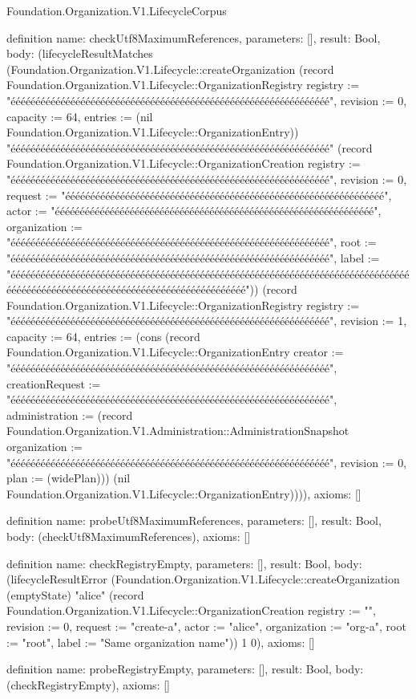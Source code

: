 \begin{lexlean}{Foundation.Organization.V1.LifecycleCorpus}
\begin{semanticmodule}
definition{
  name: checkUtf8MaximumReferences,
  parameters: [],
  result: Bool,
  body: (lifecycleResultMatches (Foundation.Organization.V1.Lifecycle::createOrganization (record Foundation.Organization.V1.Lifecycle::OrganizationRegistry {registry := "éééééééééééééééééééééééééééééééééééééééééééééééééééééééééééééééé", revision := 0, capacity := 64, entries := (nil Foundation.Organization.V1.Lifecycle::OrganizationEntry)}) "éééééééééééééééééééééééééééééééééééééééééééééééééééééééééééééééé" (record Foundation.Organization.V1.Lifecycle::OrganizationCreation {registry := "éééééééééééééééééééééééééééééééééééééééééééééééééééééééééééééééé", revision := 0, request := "éééééééééééééééééééééééééééééééééééééééééééééééééééééééééééééééé", actor := "éééééééééééééééééééééééééééééééééééééééééééééééééééééééééééééééé", organization := "éééééééééééééééééééééééééééééééééééééééééééééééééééééééééééééééé", root := "éééééééééééééééééééééééééééééééééééééééééééééééééééééééééééééééé", label := "éééééééééééééééééééééééééééééééééééééééééééééééééééééééééééééééééééééééééééééééééééééééééééééééééééééééééééééééééééééééééééééééé"})) (record Foundation.Organization.V1.Lifecycle::OrganizationRegistry {registry := "éééééééééééééééééééééééééééééééééééééééééééééééééééééééééééééééé", revision := 1, capacity := 64, entries := (cons (record Foundation.Organization.V1.Lifecycle::OrganizationEntry {creator := "éééééééééééééééééééééééééééééééééééééééééééééééééééééééééééééééé", creationRequest := "éééééééééééééééééééééééééééééééééééééééééééééééééééééééééééééééé", administration := (record Foundation.Organization.V1.Administration::AdministrationSnapshot {organization := "éééééééééééééééééééééééééééééééééééééééééééééééééééééééééééééééé", revision := 0, plan := (widePlan)})}) (nil Foundation.Organization.V1.Lifecycle::OrganizationEntry))})),
  axioms: []
}

definition{
  name: probeUtf8MaximumReferences,
  parameters: [],
  result: Bool,
  body: (checkUtf8MaximumReferences),
  axioms: []
}

definition{
  name: checkRegistryEmpty,
  parameters: [],
  result: Bool,
  body: (lifecycleResultError (Foundation.Organization.V1.Lifecycle::createOrganization (emptyState) "alice" (record Foundation.Organization.V1.Lifecycle::OrganizationCreation {registry := "", revision := 0, request := "create-a", actor := "alice", organization := "org-a", root := "root", label := "Same organization name"})) 1 0),
  axioms: []
}

definition{
  name: probeRegistryEmpty,
  parameters: [],
  result: Bool,
  body: (checkRegistryEmpty),
  axioms: []
}


\end{semanticmodule}
\end{lexlean}
